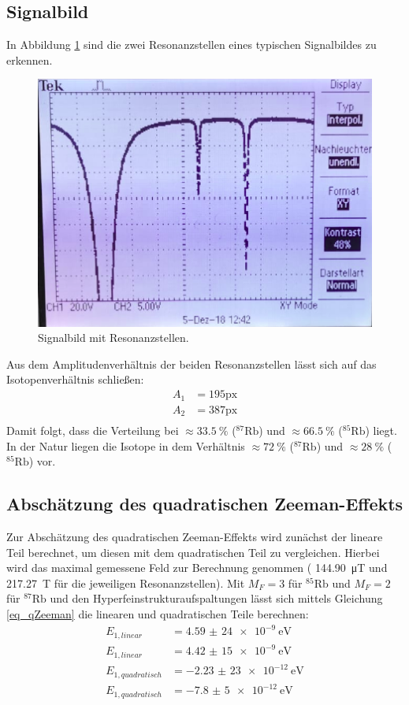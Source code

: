 \subsection{Signalbild}
In Abbildung \ref{abb:2} sind die zwei Resonanzstellen eines typischen Signalbildes
zu erkennen.

\begin{figure}
  \centering
  \includegraphics[scale=0.3]{Foto.png}
  \caption{Signalbild mit Resonanzstellen.}
  \label{abb:2}
\end{figure}

Aus dem Amplitudenverhältnis der beiden Resonanzstellen lässt sich auf das
Isotopenverhältnis schließen:
\begin{align*}
  A_1 &= 195\text{px} \\
  A_2 &= 387\text{px} \\
\end{align*}
Damit folgt, dass die Verteilung bei $\approx \SI{33,5}{\percent}$
($^{87}\text{Rb}$) und $\approx \SI{66,5}{\percent}$ ($^{85}\text{Rb}$) liegt.
In der Natur liegen die Isotope in dem
Verhältnis $\approx \SI{72}{\percent}$ ($^{87}\text{Rb}$) und
$\approx \SI{28}{\percent}$ ($^{85}\text{Rb}$) vor.

\subsection{Abschätzung des quadratischen Zeeman-Effekts}
Zur Abschätzung des quadratischen Zeeman-Effekts wird zunächst der lineare Teil
berechnet, um diesen mit dem quadratischen Teil zu vergleichen. Hierbei wird das
maximal gemessene Feld zur Berechnung genommen ( \SI{144,90}{\micro\tesla} und
\SI{217,27}{\tesla} für die jeweiligen Resonanzstellen). Mit $M_F=3$ für
$^{85}\text{Rb}$ und $M_F=2$ für $^{87}\text{Rb}$ und den
Hyperfeinstrukturaufspaltungen lässt sich mittels Gleichung \eqref{eq_qZeeman}
die linearen und quadratischen Teile berechnen:
\begin{align*}
  E_{1, linear} &= \SI{4,59(24)e-9}{\eV} \\
  E_{1, linear} &= \SI{4,42(15)e-9}{\eV} \\
  E_{1, quadratisch} &= \SI{-2,23(23)e-12}{\eV} \\
  E_{1, quadratisch} &= \SI{-7,8(5)e-12}{\eV} \\
\end{align*}
